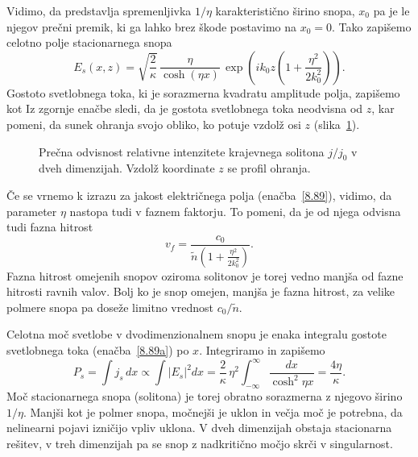 Vidimo, da predstavlja spremenljivka $1/\eta$  karakteristično širino snopa, $x_{0}$ pa
je le njegov prečni premik, ki ga lahko brez škode postavimo na $x_0=0$. Tako
zapišemo celotno polje stacionarnega snopa 
\begin{equation}
E_{s}(x,z)=\sqrt{\frac{2}{\kappa}}\,\frac{\eta}{\cosh(\eta x)}\,\exp\left(ik_{0}z\left(1+
\frac{\eta^{2}}{2k_{0}^{2}}\right)\right)\!.
\label{8.89}
\end{equation}
Gostoto svetlobnega toka, ki je sorazmerna 
kvadratu amplitude polja, zapišemo kot
Iz zgornje enačbe sledi, da je gostota svetlobnega toka neodvisna od $z$, kar pomeni, 
da sunek  ohranja svojo obliko, ko potuje vzdolž osi $z$ (slika~\ref{fig:soliton}).

\begin{figure}[ht]
\centering
\def\svgwidth{100truemm} 

\caption{Prečna odvisnost relativne intenzitete krajevnega solitona $j/j_0$ v dveh dimenzijah. 
Vzdolž koordinate $z$ se profil ohranja.}
\label{fig:soliton}
\end{figure}

Če se vrnemo k izrazu za jakost električnega polja (enačba~\ref{8.89}), vidimo, da
parameter $\eta$ nastopa tudi v faznem faktorju. To pomeni, da je od njega odvisna 
tudi fazna hitrost
\begin{equation}
v_{f}= \frac{c_0}{\tilde{n}\left(1+\frac{\eta^{2}}{2k_{0}^{2}}\right)}.
\end{equation}
Fazna hitrost omejenih snopov oziroma solitonov je torej vedno manjša od fazne hitrosti ravnih valov. 
Bolj ko je snop omejen, manjša je fazna hitrost, za velike polmere snopa pa doseže 
limitno vrednost $c_0/\tilde{n}$.

Celotna moč svetlobe v dvodimenzionalnem snopu je enaka integralu
gostote svetlobnega toka (enačba~\ref{8.89a}) po $x$. Integriramo in zapišemo 
\begin{equation}
P_s = \int j_s\,dx \propto \int |E_s|^2 dx  = 
\frac{2}{\kappa}\,\eta^{2}\int_{-\infty}^{\infty}\frac{dx}
{\cosh^{2}\eta x}=\frac{4\eta}{\kappa}.
\label{eq:solj}
\end{equation}
Moč stacionarnega snopa (solitona) je torej obratno sorazmerna 
z njegovo širino $1/\eta$. Manjši kot je polmer snopa, močnejši je uklon
in večja moč je potrebna, da nelinearni pojavi izničijo vpliv uklona. 
V dveh dimenzijah obstaja stacionarna rešitev, v treh dimenzijah pa 
se snop z nadkritično močjo skrči v singularnost.

